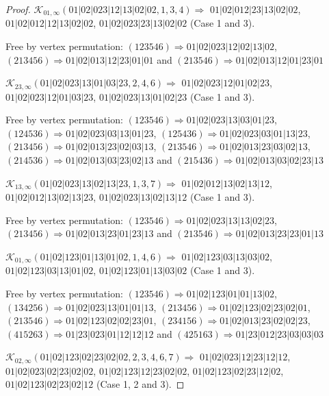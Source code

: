 \documentclass[12pt]{article}
\theoremstyle{plain}
\theoremstyle{definition}
\theoremstyle{remark}
\newcommand{\fancy}[1]{\mathcal{#1}}
\def\K{\fancy{K}}
\begin{document}
\begin{proof}
	
	\bigskip
	
	$\K_{01,\infty}(01|02|023|12|13|02|02,1, 3, 4)\Rightarrow $ $01|02|012|23|13|02|02$, $01|02|012|12|13|02|02$, $01|02|023|23|13|02|02$ (Case 1 and 3).
	
	
	
	Free by vertex permutation: $(1 2 3 5 4 6)\Rightarrow 01|02|023|12|02|13|02$, $(2 1 3 4 5 6)\Rightarrow 01|02|013|12|23|01|01$ and $(2 1 3 5 4 6)\Rightarrow 01|02|013|12|01|23|01$
	
	
	\bigskip
	
	$\K_{23,\infty}(01|02|023|13|01|03|23,2, 4, 6)\Rightarrow $ $01|02|023|12|01|02|23$, $01|02|023|12|01|03|23$, $01|02|023|13|01|02|23$ (Case 1 and 3).
	
	
	
	Free by vertex permutation: $(1 2 3 5 4 6)\Rightarrow 01|02|023|13|03|01|23$, $(1 2 4 5 3 6)\Rightarrow 01|02|023|03|13|01|23$, $(1 2 5 4 3 6)\Rightarrow 01|02|023|03|01|13|23$, $(2 1 3 4 5 6)\Rightarrow 01|02|013|23|02|03|13$, $(2 1 3 5 4 6)\Rightarrow 01|02|013|23|03|02|13$, $(2 1 4 5 3 6)\Rightarrow 01|02|013|03|23|02|13$ and $(2 1 5 4 3 6)\Rightarrow 01|02|013|03|02|23|13$
	
	
	\bigskip
	
	$\K_{13,\infty}(01|02|023|13|02|13|23,1, 3, 7)\Rightarrow $ $01|02|012|13|02|13|12$, $01|02|012|13|02|13|23$, $01|02|023|13|02|13|12$ (Case 1 and 3).
	
	
	
	Free by vertex permutation: $(1 2 3 5 4 6)\Rightarrow 01|02|023|13|13|02|23$, $(2 1 3 4 5 6)\Rightarrow 01|02|013|23|01|23|13$ and $(2 1 3 5 4 6)\Rightarrow 01|02|013|23|23|01|13$
	
	
	\bigskip
	
	$\K_{01,\infty}(01|02|123|01|13|01|02,1, 4, 6)\Rightarrow $ $01|02|123|03|13|03|02$, $01|02|123|03|13|01|02$, $01|02|123|01|13|03|02$ (Case 1 and 3).
	
	
	
	Free by vertex permutation: $(1 2 3 5 4 6)\Rightarrow 01|02|123|01|01|13|02$, $(1 3 4 2 5 6)\Rightarrow 01|02|023|13|01|01|13$, $(2 1 3 4 5 6)\Rightarrow 01|02|123|02|23|02|01$, $(2 1 3 5 4 6)\Rightarrow 01|02|123|02|02|23|01$, $(2 3 4 1 5 6)\Rightarrow 01|02|013|23|02|02|23$, $(4 1 5 2 6 3)\Rightarrow 01|23|023|01|12|12|12$ and $(4 2 5 1 6 3)\Rightarrow 01|23|012|23|03|03|03$
	
	
	\bigskip
	
	$\K_{02,\infty}(01|02|123|02|23|02|02,2, 3, 4, 6, 7)\Rightarrow $ $01|02|023|12|23|12|12$, $01|02|023|02|23|02|02$, $01|02|123|12|23|02|02$, $01|02|123|02|23|12|02$, $01|02|123|02|23|02|12$ (Case 1, 2 and 3).
	

\end{proof}
\end{document}
